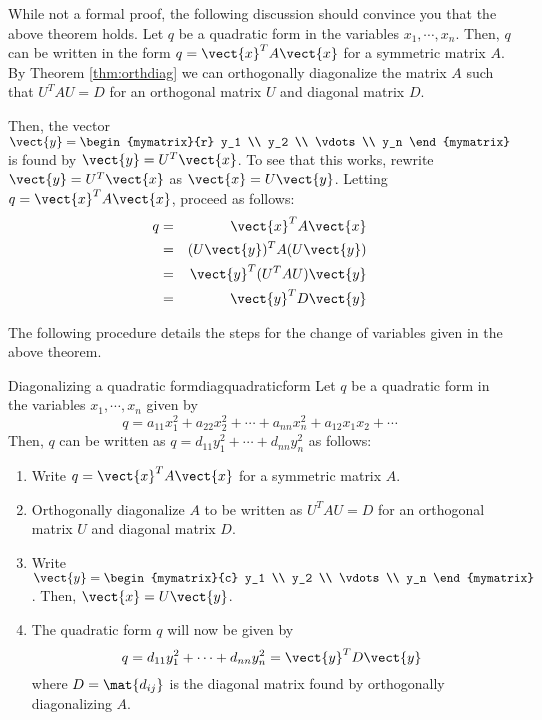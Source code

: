 While not a formal proof, the following discussion should convince you that the above theorem holds. Let $q$ be a quadratic form in the variables $x_1, \cdots, x_n$. Then, $q$ can be written in the form $q = \vect{x}^T A \vect{x}$ for a symmetric matrix $A$.  
By Theorem \ref{thm:orthdiag} we can orthogonally diagonalize the matrix $A$ such that $U^TAU = D$ for an orthogonal matrix $U$ and diagonal matrix $D$. 

Then, the vector $\vect{y} = \begin{mymatrix}{r}
y_1 \\
y_2 \\
\vdots \\
y_n
\end{mymatrix}
$ is found by $\vect{y} = U^T \vect{x}$. To see that this works, rewrite $\vect{y} = U^T \vect{x}$ as $\vect{x} = U\vect{y}$. Letting $q = \vect{x}^TA\vect{x}$, proceed as follows:
\begin{eqnarray*}
q &=& \vect{x}^T A \vect{x}\\
&=& (U\vect{y})^T A (U\vect{y})\\
&=& \vect{y}^T (U^TAU) \vect{y} \\
&=& \vect{y}^T D \vect{y}
\end{eqnarray*}

The following procedure details the steps for the change of variables given in the above theorem. 

\begin{procedure}{Diagonalizing a quadratic form}{diagquadraticform}
Let $q$ be a quadratic form in the variables $x_1, \cdots, x_n$ given by 
\[
q = a_{11}x_1^2 + a_{22}x_2^2 + \cdots + a_{nn}x_n^2 + a_{12}x_1x_2+\cdots
\]
Then, $q$ can be written as $q = d_{11}y_1^2 + \cdots + d_{nn}y_n^2$ as follows:

\begin{enumerate}
\item
Write $q = \vect{x}^T A \vect{x}$ for a symmetric matrix $A$. 

\item
Orthogonally diagonalize $A$ to be written as $U^TAU=D$ for an orthogonal matrix $U$ and diagonal matrix $D$. 

\item
Write $\vect{y} = \begin{mymatrix}{c}
y_1 \\
y_2 \\
\vdots \\
y_n
\end{mymatrix}$. Then, $\vect{x} = U \vect{y}$. 

\item 
The quadratic form $q$ will now be given by 
\[
q = d_{11}y_1^2 + \cdots + d_{nn}y_n^2 = \vect{y}^T D \vect{y}
\]
where $D = \mat{d_{ij} }$ is the diagonal matrix found by orthogonally diagonalizing $A$. 
\end{enumerate}
\end{procedure}

